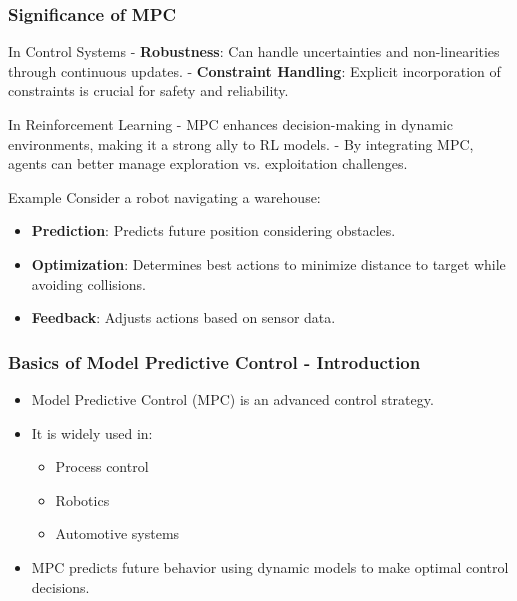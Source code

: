 \documentclass[aspectratio=169]{beamer}
\begin{document}
\begin{frame}[fragile]
    \frametitle{Significance of MPC}
    \begin{block}{In Control Systems}
        - \textbf{Robustness}: Can handle uncertainties and non-linearities through continuous updates.
        - \textbf{Constraint Handling}: Explicit incorporation of constraints is crucial for safety and reliability.
    \end{block}
    
    \begin{block}{In Reinforcement Learning}
        - MPC enhances decision-making in dynamic environments, making it a strong ally to RL models.
        - By integrating MPC, agents can better manage exploration vs. exploitation challenges.
    \end{block}
    
    \begin{block}{Example}
        Consider a robot navigating a warehouse:
        \begin{itemize}
            \item \textbf{Prediction}: Predicts future position considering obstacles.
            \item \textbf{Optimization}: Determines best actions to minimize distance to target while avoiding collisions.
            \item \textbf{Feedback}: Adjusts actions based on sensor data.
        \end{itemize}
    \end{block}
\end{frame}

\begin{frame}[fragile]
    \frametitle{Basics of Model Predictive Control - Introduction}
    \begin{itemize}
        \item Model Predictive Control (MPC) is an advanced control strategy.
        \item It is widely used in:
        \begin{itemize}
            \item Process control
            \item Robotics
            \item Automotive systems
        \end{itemize}
        \item MPC predicts future behavior using dynamic models to make optimal control decisions.
    \end{itemize}
\end{frame}
\end{document}
